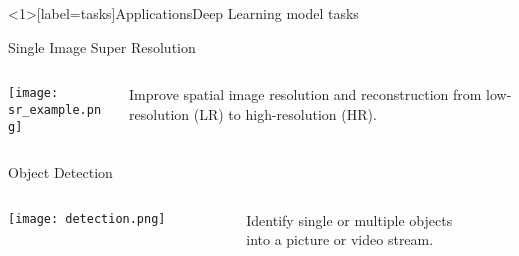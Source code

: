 \documentclass{standalone}
\begin{document}
\begin{frame}<1>[label=tasks]{Applications}{Deep Learning model tasks}



  \begin{exampleblock}{Single Image Super Resolution}
    \begin{columns}
      \begin{column}{0.7\textwidth}
        \hspace*{0.25cm}
        \texttt{[image: sr\_example.png]}
      \end{column}
      \begin{column}{0.3\textwidth}
        Improve spatial image resolution and reconstruction from low-resolution (LR) to high-resolution (HR).
      \end{column}
    \end{columns}
  \end{exampleblock}

  \begin{columns}
    \begin{column}{0.5\textwidth}

      \begin{block}{Object Detection}
        \begin{columns}
          \begin{column}{0.5\textwidth}
            \hspace*{0.25cm}
            \texttt{[image: detection.png]}
          \end{column}
          \begin{column}{0.5\textwidth}
            Identify single or multiple objects\\into a picture or video stream.
          \end{column}
        \end{columns}
      \end{block}



\end{column}
\end{columns}
\end{frame}
\end{document}
